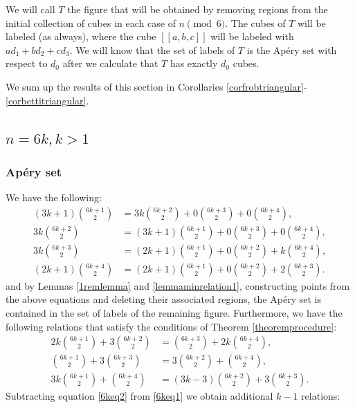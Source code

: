 \documentclass[12pt]{article}
\theoremstyle{remark}
\begin{document}
We will call $T$ the figure that will be obtained by removing regions from the initial collection of cubes in each case of $n \pmod{6}$. The cubes of $T$ will be labeled (as always), where
the cube $[[a,b,c]]$ will be labeled with $ad_1 + bd_2 + cd_3$. We will know that the set of labels of $T$ is the Ap{\'e}ry set with respect to $d_0$ after we calculate that $T$ has exactly $d_0$ cubes.


We sum up the results of this section in Corollaries \ref{corfrobtriangular}-\ref{corbettitriangular}.

\subsection{$n = 6k, k>1$}
\subsubsection{Ap{\'e}ry set}
We have the following:
\begin{align}
    (3k+1)\binom{6k+1}{2} &= 3k \binom{6k+2}{2} + 0 \binom{6k+3}{2} + 0\binom{6k+4}{2}, \label{6kminrelation0}\\
     3k \binom{6k+2}{2} &= (3k+1)\binom{6k+1}{2}+ 0 \binom{6k+3}{2} + 0\binom{6k+4}{2}, \label{6kminrelation1}\\
     3k \binom{6k+3}{2} &= (2k+1)\binom{6k+1}{2} + 0\binom{6k+2}{2} + k\binom{6k+4}{2}, \label{6kminrelation2}\\
     (2k+1)\binom{6k+4}{2} &= (2k+1)\binom{6k+1}{2} + 0\binom{6k+2}{2} + 2\binom{6k+3}{2}.\label{6kminrelation3}
\end{align}
and by Lemmas \ref{1remlemma} and \ref{lemmaminrelation1}, constructing points from the above equations and deleting their associated regions, the Ap{\'e}ry set is contained in the set of labels of the remaining figure.
Furthermore, we have the following relations that satisfy the conditions of Theorem \ref{theoremprocedure}:
\begin{align}
    2k \binom{6k+1}{2} + 3 \binom{6k+2}{2} &= \binom{6k+3}{2} + 2k\binom{6k+4}{2},\label{6keq1}\\
   \binom{6k+1}{2} + 3 \binom{6k+3}{2} &= 3\binom{6k+2}{2} + \binom{6k+4}{2},\label{6keq2}\\
   3k \binom{6k+1}{2} +  \binom{6k+4}{2} &= (3k-3)\binom{6k+2}{2} + 3\binom{6k+3}{2} .\label{6keq3}
\end{align}
Subtracting equation \eqref{6keq2} from \eqref{6keq1} we obtain additional $k-1$ relations:
\end{document}
